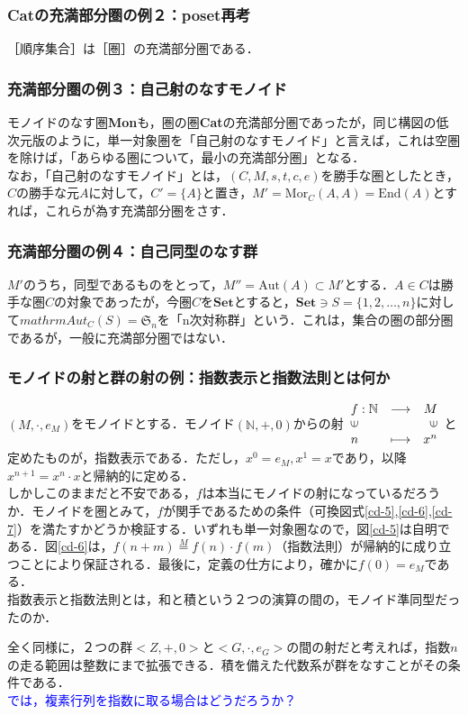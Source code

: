 \documentclass[uplatex, 12pt, a4paper, dvipdfmx]{jsarticle}
\begin{document}
\subsubsection{\textbf{Cat}の充満部分圏の例２：poset再考}
［順序集合］は［圏］の充満部分圏である．

\subsubsection{充満部分圏の例３：自己射のなすモノイド}
モノイドのなす圏\textbf{Mon}も，圏の圏\textbf{Cat}の充満部分圏であったが，同じ構図の低次元版のように，単一対象圏を「自己射のなすモノイド」と言えば，これは空圏を除けば，「あらゆる圏について，最小の充満部分圏」となる．\\
なお，「自己射のなすモノイド」とは，$(C,M,s,t,c,e)$を勝手な圏としたとき，$C$の勝手な元$A$に対して，$C'=\{ A\}$と置き，$M'=\mathrm{Mor}_C(A,A)=\mathrm{End}(A)$とすれば，これらが為す充満部分圏をさす．

\subsubsection{充満部分圏の例４：自己同型のなす群}
$M'$のうち，同型であるものをとって，$M''=\mathrm{Aut}(A)\subset M'$とする．$A\in C$は勝手な圏$C$の対象であったが，今圏$C$を$\mathbf{Set}$とすると，$\mathbf{Set}\ni S=\{ 1,2,\dots ,n\}$に対して$mathrm{Aut}_C(S)=\mathfrak{S}_n$を「n次対称群」という．これは，集合の圏の部分圏であるが，一般に充満部分圏ではない．

\subsubsection{モノイドの射と群の射の例：指数表示と指数法則とは何か}
$(M,\cdot, e_M)$をモノイドとする．モノイド$(\mathbb{N},+,0)$からの射$\begin{array}{lcr}f:\mathbb{N}&\longrightarrow &M\\ \rotatebox{90}{$\in$} & & \rotatebox{90}{$\in$} \\ n & \longmapsto & x^n \end{array}$と定めたものが，指数表示である．ただし，$x^0 = e_M, x^1 = x$であり，以降$x^{n+1}=x^n\cdot x$と帰納的に定める．\\
しかしこのままだと不安である，$f$は本当にモノイドの射になっているだろうか．モノイドを圏とみて，$f$が関手であるための条件（可換図式\ref{cd-5},\ref{cd-6},\ref{cd-7}）を満たすかどうか検証する．いずれも単一対象圏なので，図\ref{cd-5}は自明である．図\ref{cd-6}は，$f(n+m)\overset{M}{=}f(n)\cdot f(m)$（指数法則）が帰納的に成り立つことにより保証される．最後に，定義の仕方により，確かに$f(0)=e_M$である．\\
指数表示と指数法則とは，和と積という２つの演算の間の，モノイド準同型だったのか．\par
全く同様に，２つの群$<Z,+,0>$と$<G,\cdot, e_G>$の間の射だと考えれば，指数$n$の走る範囲は整数にまで拡張できる．積を備えた代数系が群をなすことがその条件である．\\
\textcolor{blue}{では，複素行列を指数に取る場合はどうだろうか？}
\end{document}
